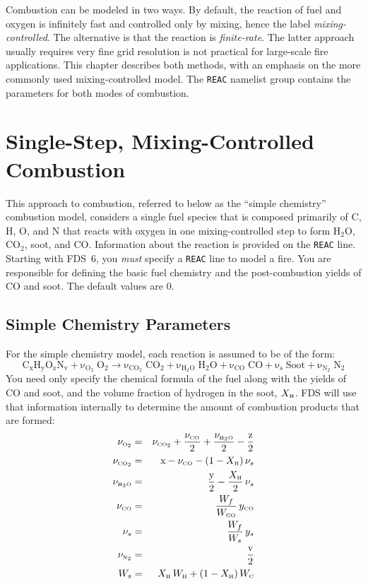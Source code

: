 \documentclass[11pt]{book}
\newcommand{\ct}{\tt\small}
\newcommand{\be}{\begin{equation}}
\newcommand{\ee}{\end{equation}}
\newcommand{\COTWO}{{\tiny \hbox{CO}_2}}
\newcommand{\HTWOO}{{\tiny \hbox{H}_2\hbox{O}}}
\newcommand{\OTWO}{{\tiny \hbox{O}_2}}
\newcommand{\NTWO}{{\tiny \hbox{N}_2}}
\newcommand{\CO}{{\tiny \hbox{CO}}}
\newcommand{\C}{{\tiny \hbox{C}}}
\newcommand{\Hy}{{\tiny \hbox{H}}}
\begin{document}
Combustion can be modeled in two ways. By default, the reaction of fuel and oxygen is infinitely fast and controlled only by mixing, hence
the label {\em mixing-controlled}. The alternative is that the reaction is {\em finite-rate}. The latter approach usually requires very fine grid resolution is not
practical for large-scale fire applications. This chapter describes both methods, with an emphasis on the more
commonly used mixing-controlled model. The {\ct REAC} namelist group contains the parameters for both modes of combustion.


\section{Single-Step, Mixing-Controlled Combustion}

This approach to combustion, referred to below as the ``simple chemistry'' combustion model, considers a single fuel species that is composed primarily of C, H, O, and N that reacts with oxygen in one mixing-controlled step to form H$_2$O, CO$_2$, soot, and CO. Information about the reaction is provided on the {\ct REAC} line. Starting with FDS~6, you {\em must} specify a {\ct REAC} line to model a fire. You are responsible for defining the basic fuel chemistry and the post-combustion yields of CO and soot. The default values are 0.

\subsection{Simple Chemistry Parameters}
\label{info:simple_chemistry}

For the simple chemistry model, each reaction is assumed to be of the form:
\be \mathrm{C_xH_yO_zN_v + \nu_{O_2} \; O_2 \rightarrow
    \nu_{CO_2} \; CO_2 + \nu_{H_2O} \; H_2O +
    \nu_{CO}   \; CO   + \nu_s \; Soot + \nu_{N_2} \; N_2} \ee
You need only specify the chemical formula of the fuel along with
the yields of CO and soot, and the volume fraction of hydrogen in the soot, $X_\Hy$.
FDS will use that information internally to determine the amount of combustion products that are formed:
\begin{eqnarray*}
\nu_{\OTWO}    &=& \nu_{\COTWO} + \frac{\nu_{\CO}}{2} + \frac{\nu_{\HTWOO}}{2} - \frac{\hbox{z}}{2}   \\
\nu_{\COTWO}   &=& \hbox{x} - \nu_{\CO} - (1-X_\Hy) \, \nu_s \\
\nu_{\HTWOO}   &=& \frac{\hbox{y}}{2} - \frac{X_\Hy}{2} \, \nu_s \\
\nu_{\CO}      &=& \frac{W_f}{W_{\CO}} \, y_{\CO}  \\
\nu_s          &=& \frac{W_f}{W_s} \, y_s  \\
\nu_{\NTWO}    &=& \frac{\hbox{v}}{2}  \\
W_s            &=& X_\Hy \, W_\Hy + (1-X_\Hy) \, W_\C
\end{eqnarray*}
\end{document}
